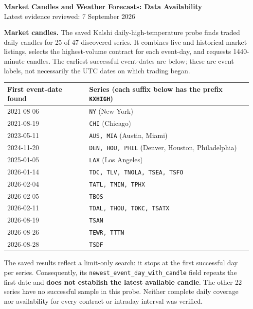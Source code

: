 \documentclass[10pt,a4paper]{article}
\begin{document}
\begin{center}
  {\Large\bfseries Market Candles and Weather Forecasts: Data Availability}\\[3pt]
  Latest evidence reviewed: 7 September 2026
\end{center}

\textbf{Market candles.}
The saved Kalshi daily-high-temperature probe finds traded daily candles for
25 of 47 discovered series. It combines live and historical market listings,
selects the highest-volume contract for each event-day, and requests
1440-minute candles. The earliest successful event-dates are below; these are
event labels, not necessarily the UTC dates on which trading began.

\begin{center}
\small
\begin{tabularx}{\linewidth}{@{}lX@{}}
\toprule
First event-date found & Series (each suffix below has the prefix \texttt{KXHIGH}) \\
\midrule
2021-08-06 & \texttt{NY} (New York) \\
2021-08-19 & \texttt{CHI} (Chicago) \\
2023-05-11 & \texttt{AUS, MIA} (Austin, Miami) \\
2024-11-20 & \texttt{DEN, HOU, PHIL} (Denver, Houston, Philadelphia) \\
2025-01-05 & \texttt{LAX} (Los Angeles) \\
2026-01-14 & \texttt{TDC, TLV, TNOLA, TSEA, TSFO} \\
2026-02-04 & \texttt{TATL, TMIN, TPHX} \\
2026-02-05 & \texttt{TBOS} \\
2026-02-11 & \texttt{TDAL, THOU, TOKC, TSATX} \\
2026-08-19 & \texttt{TSAN} \\
2026-08-26 & \texttt{TEWR, TTTN} \\
2026-08-28 & \texttt{TSDF} \\
\bottomrule
\end{tabularx}
\end{center}

The saved results reflect a limit-only search: it stops at the first successful
day per series. Consequently, its \texttt{newest\_event\_day\_with\_candle} field
repeats the first date and \textbf{does not establish the latest available candle}.
The other 22 series have no successful sample in this probe. Neither complete
daily coverage nor availability for every contract or intraday interval was
verified.
\end{document}
